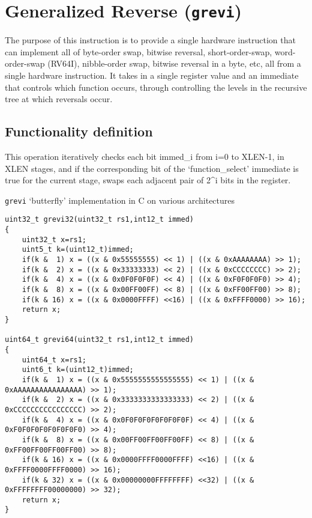 
\section{Generalized Reverse (\texttt{grevi})}

The purpose of this instruction is to provide a single hardware
instruction that can implement all of byte-order swap, bitwise reversal,
short-order-swap, word-order-swap (RV64I), nibble-order swap, bitwise
reversal in a byte, etc, all from a single hardware instruction. It
takes in a single register value and an immediate that controls which
function occurs, through controlling the levels in the recursive tree at
which reversals occur.

\subsection{Functionality definition}

This operation iteratively checks each bit immed\_i from i=0 to XLEN-1,
in XLEN stages, and if the corresponding bit of the `function\_select'
immediate is true for the current stage, swaps each adjacent pair of
2\^{}i bits in the register.

\texttt{grevi} `butterfly' implementation in C on various architectures

\begin{verbatim}
uint32_t grevi32(uint32_t rs1,int12_t immed)
{
    uint32_t x=rs1;
    uint5_t k=(uint12_t)immed;
    if(k &  1) x = ((x & 0x55555555) << 1) | ((x & 0xAAAAAAAA) >> 1);
    if(k &  2) x = ((x & 0x33333333) << 2) | ((x & 0xCCCCCCCC) >> 2);
    if(k &  4) x = ((x & 0x0F0F0F0F) << 4) | ((x & 0xF0F0F0F0) >> 4);
    if(k &  8) x = ((x & 0x00FF00FF) << 8) | ((x & 0xFF00FF00) >> 8);
    if(k & 16) x = ((x & 0x0000FFFF) <<16) | ((x & 0xFFFF0000) >> 16);
    return x;
}

uint64_t grevi64(uint32_t rs1,int12_t immed)
{
    uint64_t x=rs1;
    uint6_t k=(uint12_t)immed;
    if(k &  1) x = ((x & 0x5555555555555555) << 1) | ((x & 0xAAAAAAAAAAAAAAAA) >> 1);
    if(k &  2) x = ((x & 0x3333333333333333) << 2) | ((x & 0xCCCCCCCCCCCCCCCC) >> 2);
    if(k &  4) x = ((x & 0x0F0F0F0F0F0F0F0F) << 4) | ((x & 0xF0F0F0F0F0F0F0F0) >> 4);
    if(k &  8) x = ((x & 0x00FF00FF00FF00FF) << 8) | ((x & 0xFF00FF00FF00FF00) >> 8);
    if(k & 16) x = ((x & 0x0000FFFF0000FFFF) <<16) | ((x & 0xFFFF0000FFFF0000) >> 16);
    if(k & 32) x = ((x & 0x00000000FFFFFFFF) <<32) | ((x & 0xFFFFFFFF00000000) >> 32);
    return x;
}
\end{verbatim}

